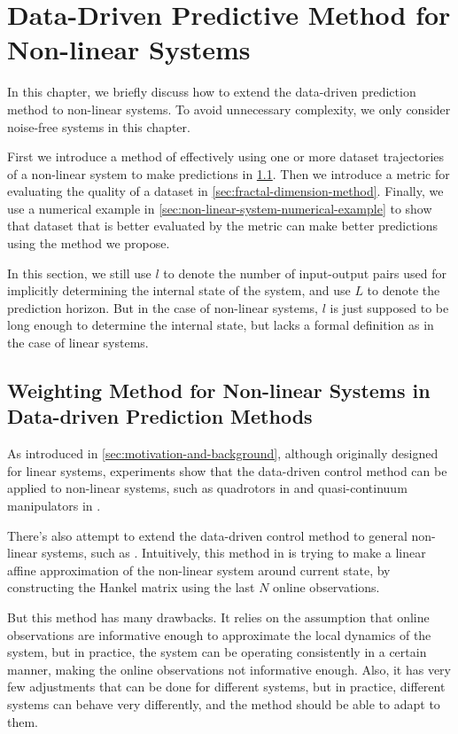 \chapter{Data-Driven Predictive Method for Non-linear Systems}\label{chap:non-linear-system}

In this chapter, we briefly discuss how to extend the data-driven prediction method to non-linear systems.
To avoid unnecessary complexity, we only consider noise-free systems in this chapter.

First we introduce a method of effectively using one or more dataset trajectories of a non-linear system to make predictions in \cref{sec:weighting-method}.
Then we introduce a metric for evaluating the quality of a dataset in \cref{sec:fractal-dimension-method}.
Finally, we use a numerical example in \cref{sec:non-linear-system-numerical-example} to show that dataset that is better evaluated by the metric can make better predictions using the method we propose.

In this section, we still use $l$ to denote the number of input-output pairs used for implicitly determining the internal state of the system, and use $L$ to denote the prediction horizon.
But in the case of non-linear systems, $l$ is just supposed to be long enough to determine the internal state, but lacks a formal definition as in the case of linear systems.


\section{Weighting Method for Non-linear Systems in Data-driven Prediction Methods}\label{sec:weighting-method}

As introduced in \cref{sec:motivation-and-background}, although originally designed for linear systems, experiments show that the data-driven control method can be applied to non-linear systems, such as quadrotors in \cite{elokdaDataQuad2021} and quasi-continuum manipulators in \cite{mullerDataDrivenQCR2022}.

There's also attempt to extend the data-driven control method to general non-linear systems, such as \cite{berberichLinearTrackingMPCData2022}.
Intuitively, this method in \cite{berberichLinearTrackingMPCData2022} is trying to make a linear affine approximation of the non-linear system around current state, by constructing the Hankel matrix using the last $N$ online observations.

But this method has many drawbacks.
It relies on the assumption that online observations are informative enough to approximate the local dynamics of the system, but in practice, the system can be operating consistently in a certain manner, making the online observations not informative enough.
Also, it has very few adjustments that can be done for different systems, but in practice, different systems can behave very differently, and the method should be able to adapt to them.

